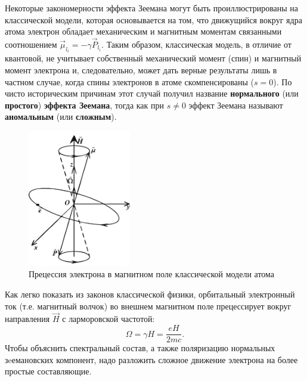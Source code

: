 
Некоторые закономерности эффекта Зеемана могут быть проиллюстрированы на классической модели, которая основывается на том, что движущийся вокруг ядра атома электрон обладает механическим и магнитным моментам связанными соотношением $\vec{\mu}_{l_i}=-\gamma \vec{P}_{l_i}$. Таким образом, классическая модель, в отличие от квантовой, не учитывает собственный механический момент (спин) и магнитный момент электрона и, следовательно, может дать верные результаты лишь в частном случае, когда спины электронов в атоме скомпенсированы ($s=0$). По чисто историческим причинам этот случай получил название \textbf{нормального} (или \textbf{простого}) \textbf{эффекта Зеемана}, тогда как при \textbf{$s\ne0$} эффект Зеемана называют \textbf{аномальным} (или \textbf{сложным}). 

\begin{figure}
\begin{center}
\vspace{-50pt}
\includegraphics[width=0.4\textwidth]{fig/fig4.jpg}
\vspace{-45pt}
\end{center}
\caption{Прецессия электрона в магнитном поле классической модели атома}
\label{fig:4}
\end{figure}

Как легко показать из законов классической физики, орбитальный электронный ток (т.е. магнитный волчок) во внешнем магнитном поле прецессирует вокруг направления $\vec{H}$ с ларморовской частотой: 
\begin{equation}
	\label{eq:22}
	\Omega=\gamma H=\frac{eH}{2mc}.
\end{equation} 
Чтобы объяснить спектральный состав, а также поляризацию нормальных зeемановских компонент, надо разложить сложное движение электрона на более простые составляющие.

